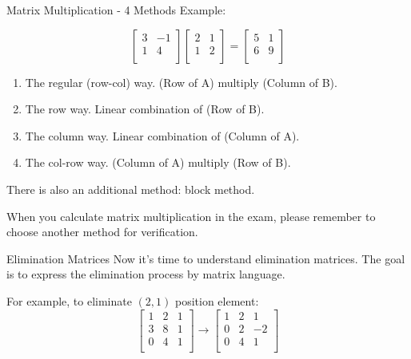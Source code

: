 \documentclass{beamer}
\begin{document}
\begin{frame}{Matrix Multiplication - 4 Methods}
Example:

\begin{equation*}
    \left[ \begin{matrix}
        3&		-1\\
        1&		4\\
    \end{matrix} \right] \left[ \begin{matrix}
        2&		1\\
        1&		2\\
    \end{matrix} \right] =\left[ \begin{matrix}
        5&		1\\
        6&		9\\
    \end{matrix} \right]
\end{equation*}

\begin{enumerate}
    \item The regular (row-col) way. (Row of A) multiply (Column of B).
    \item The row way. Linear combination of (Row of B).
    \item The column way. Linear combination of (Column of A).
    \item The col-row way. (Column of A) multiply (Row of B).
\end{enumerate}

There is also an additional method: block method.

\vspace{3pt}
When you calculate matrix multiplication in the exam, please remember to choose another method for verification.
\end{frame}

\begin{frame}{Elimination Matrices}
Now it's time to understand elimination matrices. The goal is to express the elimination process by matrix language.

\vspace{3pt}
For example, to eliminate $(2,1)$ position element:
\begin{equation*}
    \left[ \begin{matrix}
        1&		2&		1\\
        3&		8&		1\\
        0&		4&		1\\
    \end{matrix} \right] \rightarrow \left[ \begin{matrix}
        1&		2&		1\\
        0&		2&		-2\\
        0&		4&		1\\
    \end{matrix} \right]
\end{equation*}

\end{frame}
\end{document}
